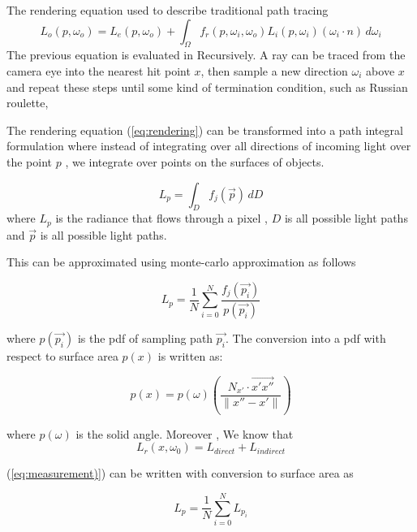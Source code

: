 \documentclass[11pt, a4paper]{article}
\begin{document}
The rendering equation used to describe traditional path tracing 
\begin{equation}\label{eq:rendering}
    L_o(p, \omega_o) = L_e(p, \omega_o) + \int_{\Omega} f_r(p, \omega_i, \omega_o) L_i(p, \omega_i) (\omega_i \cdot n) \, d\omega_i
\end{equation}
The previous equation is evaluated in Recursively. A ray can be traced from the camera eye into the nearest hit point $x$, then sample a new direction $\omega_i$ above $x$ and repeat these steps until  some kind of termination condition, such as Russian roulette,

The rendering equation (\ref{eq:rendering}) can be transformed into a path integral formulation where instead of integrating over all directions of incoming light over the point $p$ , we integrate over points on the surfaces of objects. 

\begin{equation}\label{eq:rendering_path_integral)}
    L_p = \int_{D} f_j(\vec{p})  \, dD
\end{equation}
where $L_p$ is the radiance that flows through a pixel , $D$ is all possible light paths and $\vec{p}$ is all possible light paths.

This can be approximated using monte-carlo approximation as follows 

\begin{equation}\label{eq:rendering_path_integral_monte_carlo)}
    L_p = \frac{1}{N} \sum_{i=0}^{N}\frac{f_j(\vec{p_i})}{p(\vec{p_i})}
\end{equation}

where $p(\vec{p_i}) $ is the pdf of sampling path $\vec{p_i}$. The conversion into a pdf with respect to surface area $p(x)$ is written as:

\begin{equation}\label{eq:conversion_pdf)}
    p(x) = p(\omega) \left(\frac{N_{x'} \cdot \vec{x'x''}}{\|x'' - x'\|}\right)
\end{equation}

where $p{(\omega)}$ is the solid angle. Moreover , We know that 
\begin{equation}\label{eq:measurement)}
    L_r(x,\omega_0) = L_{direct} + L_{indirect}
\end{equation}
 
(\ref{eq:measurement)}) can be written with conversion to surface area as 

\begin{equation}
    L_p = \frac{1}{N}\sum_{i=0}^{N}L_{p_i}
\end{equation}
\end{document}
